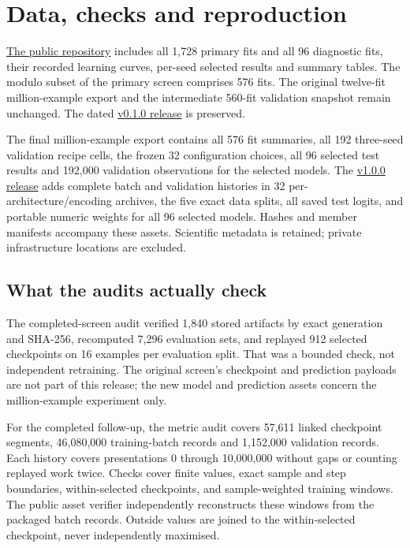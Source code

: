 \documentclass{article}
\newcommand{\repo}{https://github.com/AntreasAntoniou/learning-modulo-seven}
\begin{document}
\newpage
\section{Data, checks and reproduction}
\href{\repo}{The public repository} includes all 1,728 primary fits and all 96
diagnostic fits, their recorded learning curves, per-seed selected results and
summary tables. The modulo subset of the primary screen comprises 576 fits.
The original twelve-fit million-example export and the intermediate 560-fit
validation snapshot remain unchanged. The dated
\href{\repo/releases/tag/v0.1.0}{v0.1.0 release} is preserved.

The final million-example export contains all 576 fit summaries, all 192
three-seed validation recipe cells, the frozen 32 configuration choices, all 96
selected test results and 192,000 validation observations for the selected models.
The \href{\repo/releases/tag/v1.0.0}{v1.0.0 release} adds complete batch and validation
histories in 32 per-architecture/encoding archives, the five exact data splits,
all saved test logits, and portable numeric weights for all 96 selected models.
Hashes and member manifests accompany these assets. Scientific metadata is
retained; private infrastructure locations are excluded.

\subsection{What the audits actually check}
The completed-screen audit verified 1,840 stored artifacts by exact generation and
SHA-256, recomputed 7,296 evaluation sets, and replayed 912 selected checkpoints
on 16 examples per evaluation split. That was a bounded check, not independent
retraining. The original screen's checkpoint and prediction payloads are not part
of this release; the new model and prediction assets concern the million-example
experiment only.

For the completed follow-up, the metric audit covers 57,611 linked checkpoint
segments, 46,080,000 training-batch records and 1,152,000 validation records.
Each history covers presentations 0 through 10,000,000 without gaps or
counting replayed work twice. Checks cover finite values, exact sample and step
boundaries, within-selected checkpoints, and sample-weighted training windows.
The public asset verifier independently reconstructs these windows from the
packaged batch records. Outside values are joined to the within-selected
checkpoint, never independently maximised.
\end{document}
